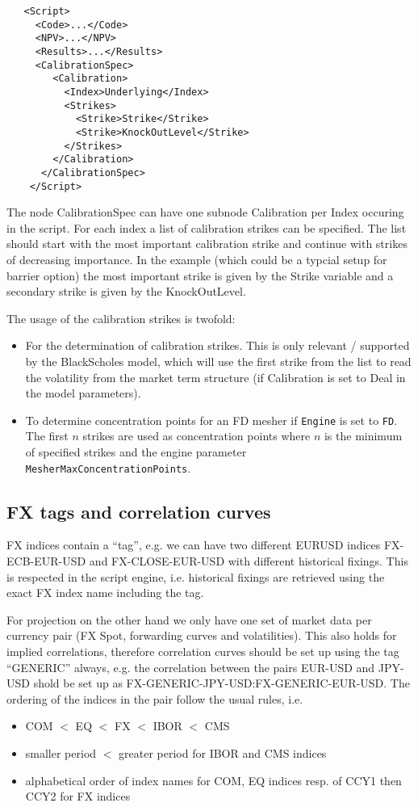 \begin{verbatim}
   <Script>
     <Code>...</Code>
     <NPV>...</NPV>
     <Results>...</Results>
     <CalibrationSpec>
        <Calibration>
          <Index>Underlying</Index>
          <Strikes>
            <Strike>Strike</Strike>
            <Strike>KnockOutLevel</Strike>
          </Strikes>
        </Calibration>
      </CalibrationSpec>
    </Script>
\end{verbatim}

The node CalibrationSpec can have one subnode Calibration per Index occuring in the script. For each index a list of
calibration strikes can be specified. The list should start with the most important calibration strike and continue with
strikes of decreasing importance. In the example (which could be a typcial setup for barrier option) the most important
strike is given by the Strike variable and a secondary strike is given by the KnockOutLevel.

The usage of the calibration strikes is twofold:

\begin{itemize}
\item For the determination of calibration strikes. This is only relevant / supported by the BlackScholes model, which
  will use the first strike from the list to read the volatility from the market term structure (if Calibration is set
  to Deal in the model parameters).
\item To determine concentration points for an FD mesher if \verb+Engine+ is set to \verb+FD+. The first $n$ strikes are
  used as concentration points where $n$ is the minimum of specified strikes and the engine parameter
  \verb+MesherMaxConcentrationPoints+.
\end{itemize}

\subsection{FX tags and correlation curves}\label{fxtags_correlationcurves}

FX indices contain a ``tag'', e.g. we can have two different EURUSD indices FX-ECB-EUR-USD and FX-CLOSE-EUR-USD with
different historical fixings. This is respected in the script engine, i.e. historical fixings are retrieved using the
exact FX index name including the tag.

For projection on the other hand we only have one set of market data per currency pair (FX Spot, forwarding curves and
volatilities). This also holds for implied correlations, therefore correlation curves should be set up using the tag
``GENERIC'' always, e.g. the correlation between the pairs EUR-USD and JPY-USD shold be set up as
FX-GENERIC-JPY-USD:FX-GENERIC-EUR-USD. The ordering of the indices in the pair follow the usual rules, i.e.

\begin{itemize}
\item COM $<$ EQ $<$ FX $<$ IBOR $<$ CMS
\item smaller period $<$ greater period for IBOR and CMS indices
\item alphabetical order of index names for COM, EQ indices resp. of CCY1 then CCY2 for FX indices
\end{itemize}
